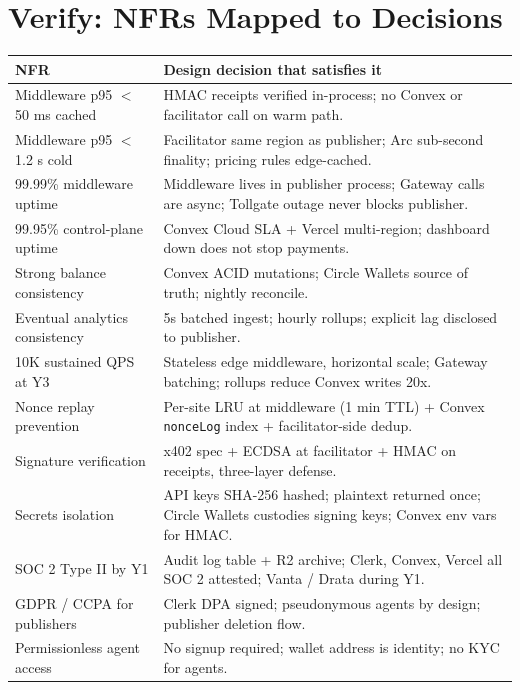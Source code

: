 \documentclass[11pt,a4paper]{article}
\begin{document}
\newpage

\section{Verify: NFRs Mapped to Decisions}

\begin{table}[H]
\centering
\footnotesize
\begin{tabularx}{\textwidth}{@{} l X @{}}
\toprule
\textbf{NFR} & \textbf{Design decision that satisfies it} \\
\midrule
Middleware p95 $<$ 50 ms cached & HMAC receipts verified in-process; no Convex or facilitator call on warm path. \\
Middleware p95 $<$ 1.2 s cold & Facilitator same region as publisher; Arc sub-second finality; pricing rules edge-cached. \\
99.99\% middleware uptime & Middleware lives in publisher process; Gateway calls are async; Tollgate outage never blocks publisher. \\
99.95\% control-plane uptime & Convex Cloud SLA + Vercel multi-region; dashboard down does not stop payments. \\
Strong balance consistency & Convex ACID mutations; Circle Wallets source of truth; nightly reconcile. \\
Eventual analytics consistency & 5s batched ingest; hourly rollups; explicit lag disclosed to publisher. \\
10K sustained QPS at Y3 & Stateless edge middleware, horizontal scale; Gateway batching; rollups reduce Convex writes 20x. \\
Nonce replay prevention & Per-site LRU at middleware (1 min TTL) + Convex \texttt{nonceLog} index + facilitator-side dedup. \\
Signature verification & x402 spec + ECDSA at facilitator + HMAC on receipts, three-layer defense. \\
Secrets isolation & API keys SHA-256 hashed; plaintext returned once; Circle Wallets custodies signing keys; Convex env vars for HMAC. \\
SOC 2 Type II by Y1 & Audit log table + R2 archive; Clerk, Convex, Vercel all SOC 2 attested; Vanta / Drata during Y1. \\
GDPR / CCPA for publishers & Clerk DPA signed; pseudonymous agents by design; publisher deletion flow. \\
Permissionless agent access & No signup required; wallet address is identity; no KYC for agents. \\
\bottomrule
\end{tabularx}
\end{table}
\end{document}

